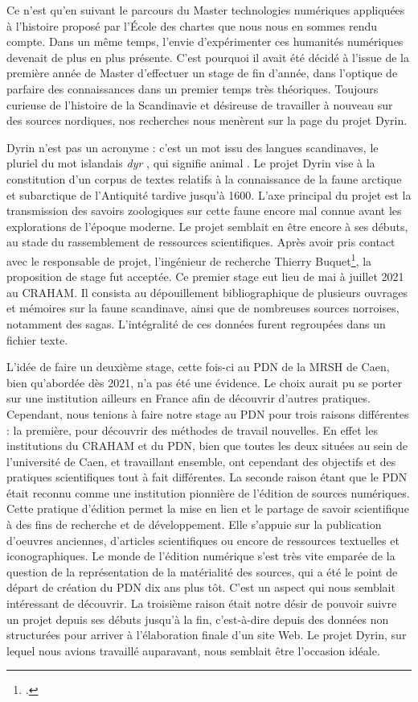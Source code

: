 \documentclass[a4paper,12pt,twoside]{book}
\begin{document}
Ce n'est qu'en suivant le parcours du Master technologies numériques appliquées à l'histoire proposé par l'École des chartes que nous nous en sommes rendu compte. Dans un même temps, l'envie d'expérimenter ces humanités numériques devenait de plus en plus présente. C'est pourquoi il avait été décidé à l'issue de la première année de Master d'effectuer un stage de fin d'année, dans l'optique de parfaire des connaissances dans un premier temps très théoriques. Toujours curieuse de l'histoire de la Scandinavie et désireuse de travailler à nouveau sur des sources nordiques, nos recherches nous menèrent sur la page du projet Dyrin.

Dyrin n'est pas un acronyme : c'est un mot issu des langues scandinaves, le pluriel du mot islandais \og \textit{dyr} \fg, qui signifie \og animal \fg. Le projet Dyrin vise à la constitution d'un corpus de textes relatifs à la connaissance de la faune arctique et subarctique de l'Antiquité tardive jusqu'à 1600. L'axe principal du projet est la transmission des savoirs zoologiques sur cette faune encore mal connue avant les explorations de l'époque moderne. Le projet semblait en être encore à ses débuts, au stade du rassemblement de ressources scientifiques.
Après avoir pris contact avec le responsable de projet, l'ingénieur de recherche Thierry Buquet\footcite{buquet_thierry}, la proposition de stage fut acceptée. Ce premier stage eut lieu de mai à juillet 2021 au \acrfull{CRAHAM}. Il consista au dépouillement bibliographique de plusieurs ouvrages et mémoires sur la faune scandinave, ainsi que de nombreuses sources norroises, notamment des sagas. L'intégralité de ces données furent regroupées dans un fichier texte.

L'idée de faire un deuxième stage, cette fois-ci au \acrlong{PDN} de la \acrlong{MRSH} de Caen, bien qu'abordée dès 2021, n'a pas été une évidence. Le choix aurait pu se porter sur une institution ailleurs en France afin de découvrir d'autres pratiques. Cependant, nous tenions à faire notre stage au \acrshort{PDN} pour trois raisons différentes : la première, pour découvrir des méthodes de travail nouvelles. En effet les institutions du \acrshort{CRAHAM} et du \acrshort{PDN}, bien que toutes les deux situées au sein de l'université de Caen, et travaillant ensemble, ont cependant des objectifs et des pratiques scientifiques tout à fait différentes. La seconde raison étant que le \acrshort{PDN} était reconnu comme une institution pionnière de l'édition de sources numériques. Cette pratique d'édition permet la mise en lien et le partage de savoir scientifique à des fins de recherche et de développement. Elle s'appuie sur la publication d'oeuvres anciennes, d'articles scientifiques ou encore de ressources textuelles et iconographiques. Le monde de l'édition numérique s'est très vite emparée de la question de la représentation de la matérialité des sources, qui a été le point de départ de création du \acrshort{PDN} dix ans plus tôt. C'est un aspect qui nous semblait intéressant de découvrir. La troisième raison était notre désir de pouvoir suivre un projet depuis ses débuts jusqu'à la fin, c'est-à-dire depuis des données non structurées pour arriver à l'élaboration finale d'un site Web. Le projet Dyrin, sur lequel nous avions travaillé auparavant, nous semblait être l'occasion idéale.
\end{document}

